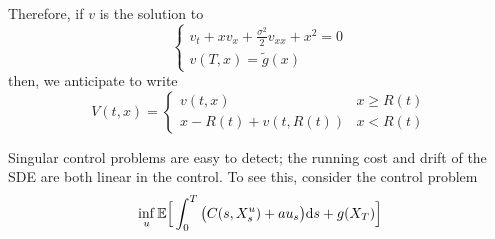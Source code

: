 \documentclass[11pt]{book}
\newcommand{\dt}{\text{\normalfont d}t}
\newcommand{\ds}{\text{\normalfont d}s}
\newcommand{\dX}{\text{\normalfont d}X}
\newcommand{\dW}{\text{\normalfont d}W}
\begin{document}
\begin{eg}
Therefore, if $v$ is the solution to 
    \begin{equation}\label{eqn:for v in sigular example}
        \begin{cases}
            {v}_{t} + x v_{x} + \frac{\sigma^2}{2} v_{xx}  + x^2 =0\\
            v(T,x)=\tilde{g}(x) 
        \end{cases}
    \end{equation}
    then, we anticipate to write 
    \begin{equation}
        V(t,x)=\begin{cases}
            v(t,x)& x\ge R(t)\\
            x-R(t)+v(t,R(t))& x< R(t)
        \end{cases}
    \end{equation}
        



\end{eg}
Singular control problems are easy to detect; the running cost and drift of the SDE are both linear in the control. To see this, consider the control problem
\begin{equation}\label{eqn:dpp_singular}
        \inf_{u}\mathbb{E}\Big[\int_0^T \big(C(s,X^u_s)+au_s\big){{\ds}} + g(X_T)\Big]
    \end{equation}
\end{document}
